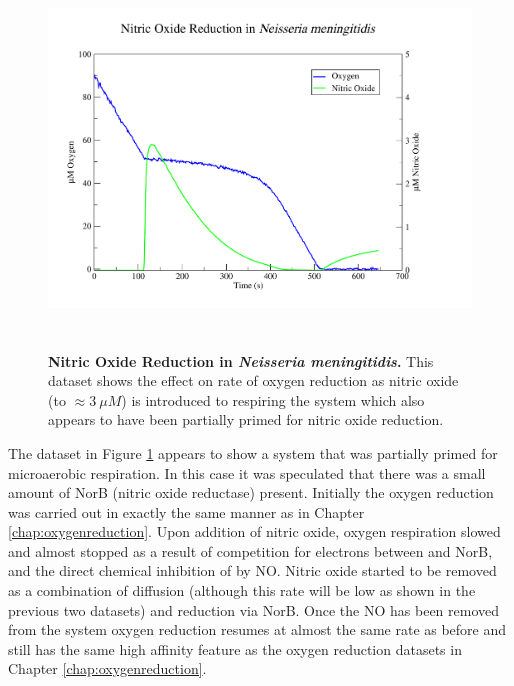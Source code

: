 \begin{figure}[tbp]
 \centering
 \includegraphics[height=10cm, trim=2cm 1cm 4cm 1cm]{./06-noreduction/data/aer-no-data.pdf}
 \caption[{Nitric Oxide Reduction in \textit{Neisseria meningitidis}.}]{{\bf Nitric Oxide Reduction in \textit{Neisseria meningitidis}.} This dataset shows the effect on rate of oxygen reduction as nitric oxide (to $\approx 3~\mu M$) is introduced to respiring the system which also appears to have been partially primed for nitric oxide reduction.}
 \label{fig:nodata}
\end{figure}
The dataset in Figure \ref{fig:nodata} appears to show a system that was partially primed for microaerobic respiration. In this case it was speculated that there was a small amount of NorB (nitric oxide reductase) present. Initially the oxygen reduction was carried out in exactly the same manner as in Chapter \ref{chap:oxygenreduction}. Upon addition of nitric oxide, oxygen respiration slowed and almost stopped as a result of competition for electrons between \cbbthree{} and NorB, and the direct chemical inhibition of \cbbthree{} by NO. Nitric oxide started to be removed as a combination of diffusion (although this rate will be low as shown in the previous two datasets) and reduction via NorB. Once the NO has been removed from the system oxygen reduction resumes at almost the same rate as before and still has the same high affinity feature as the oxygen reduction datasets in Chapter \ref{chap:oxygenreduction}.
